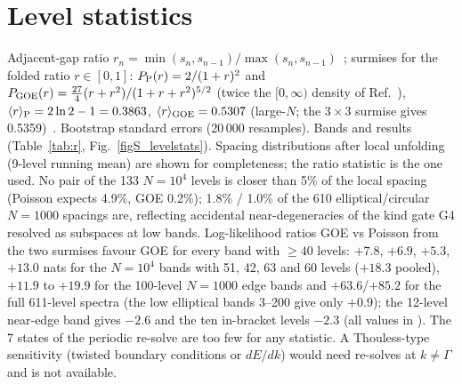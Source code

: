 \documentclass[aps,prl,preprint,superscriptaddress,longbibliography,nofootinbib]{revtex4-2}
\begin{document}
\section{Level statistics}
Adjacent-gap ratio $r_n=\min(s_n,s_{n-1})/\max(s_n,s_{n-1})$~\cite{Oganesyan2007}; surmises for the folded ratio $r\in[0,1]$: $P_{\rm P}(r)=2/(1+r)^2$ and $P_{\rm GOE}(r)=\frac{27}{4}(r+r^2)/(1+r+r^2)^{5/2}$ (twice the $[0,\infty)$ density of Ref.~\cite{Atas2013}), $\langle r\rangle_{\rm P}=2\ln2-1=0.3863$, $\langle r\rangle_{\rm GOE}=0.5307$ (large-$N$; the $3\times3$ surmise gives 0.5359)~\cite{Atas2013}. Bootstrap standard errors (20\,000 resamples). Bands and results (Table~\ref{tab:r}, Fig.~\ref{figS_levelstats}). Spacing distributions after local unfolding (9-level running mean) are shown for completeness; the ratio statistic is the one used. No pair of the 133 $N=10^4$ levels is closer than 5\% of the local spacing (Poisson expects 4.9\%, GOE 0.2\%); 1.8\% / 1.0\% of the 610 elliptical/circular $N=1000$ spacings are, reflecting accidental near-degeneracies of the kind gate G4 resolved as subspaces at low bands. Log-likelihood ratios GOE vs Poisson from the two surmises favour GOE for every band with $\ge40$ levels: $+7.8$, $+6.9$, $+5.3$, $+13.0$ nats for the $N=10^4$ bands with 51, 42, 63 and 60 levels ($+18.3$ pooled), $+11.9$ to $+19.9$ for the 100-level $N=1000$ edge bands and $+63.6$/$+85.2$ for the full 611-level spectra (the low elliptical bands 3--200 give only $+0.9$); the 12-level near-edge band gives $-2.6$ and the ten in-bracket levels $-2.3$ (all values in ). The 7 states of the periodic re-solve are too few for any statistic. A Thouless-type sensitivity (twisted boundary conditions or $dE/dk$) would need re-solves at $k\ne\Gamma$ and is not available.
\end{document}
